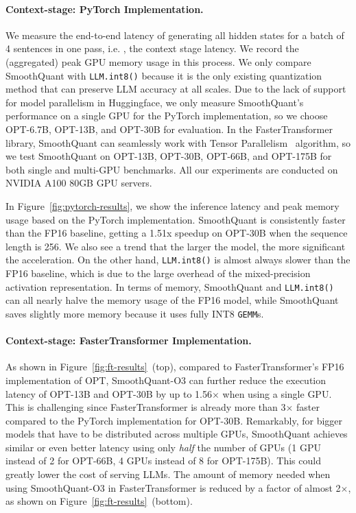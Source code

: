 \paragraph{Context-stage: PyTorch Implementation.} We measure the end-to-end latency of generating all hidden states for a batch of 4 sentences in one pass, i.e. , the context stage latency. We record the (aggregated) peak GPU memory usage in this process. We only compare SmoothQuant with \texttt{LLM.int8()} because it is the only existing quantization method that can preserve LLM accuracy at all scales. Due to the lack of support for model parallelism in Huggingface, we only measure SmoothQuant's performance on a single GPU for the PyTorch implementation, so we choose OPT-6.7B, OPT-13B, and OPT-30B for evaluation. In the FasterTransformer library, SmoothQuant can seamlessly work with Tensor Parallelism~\cite{megatron_lm} algorithm, so we test SmoothQuant on OPT-13B, OPT-30B, OPT-66B, and OPT-175B for both single and multi-GPU benchmarks. All our experiments are conducted on NVIDIA A100 80GB GPU servers.

In Figure~\ref{fig:pytorch-results}, we show the inference latency and peak memory usage based on the PyTorch implementation. SmoothQuant is consistently faster than the FP16 baseline, getting a 1.51x speedup on OPT-30B when the sequence length is 256. We also see a trend that the larger the model, the more significant the acceleration. On the other hand, \texttt{LLM.int8()} is almost always slower than the FP16 baseline, which is due to the large overhead of the mixed-precision activation representation. In terms of memory, SmoothQuant and \texttt{LLM.int8()} can all nearly halve the memory usage of the FP16 model, while SmoothQuant saves slightly more memory because it uses fully INT8 \texttt{GEMM}s.

\paragraph{Context-stage: FasterTransformer Implementation.} As shown in Figure~\ref{fig:ft-results}~(top), compared to FasterTransformer's FP16 implementation of OPT, SmoothQuant-O3 can further reduce the execution latency of OPT-13B and OPT-30B by up to 1.56$\times$ when using a single GPU. This is challenging since FasterTransformer is already more than 3$\times$ faster compared to the PyTorch implementation for OPT-30B. Remarkably, for bigger models that have to be distributed across multiple GPUs, SmoothQuant achieves similar or even better latency using only \emph{half} the number of GPUs (1 GPU instead of 2 for OPT-66B, 4 GPUs instead of 8 for OPT-175B). This could greatly lower the cost of serving LLMs. The amount of memory needed when using SmoothQuant-O3 in FasterTransformer is reduced by a factor of almost 2$\times$, as shown on Figure~\ref{fig:ft-results}~(bottom).


